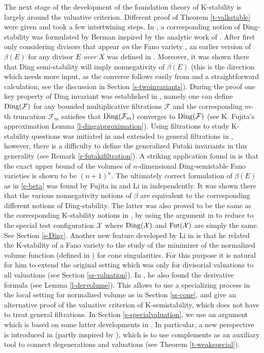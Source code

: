 \documentclass[12pt,reqno]{amsart}%
\newcommand{\cX}{{\mathcal{X}}}
\newcommand{\cF}{\mathcal{F}}
\theoremstyle{definition}
\theoremstyle{remark}
\newcommand{\Fut}{{\rm Fut}}
\newcommand{\Ding}{{\rm Ding}}
\begin{document}
The next stage of the development of the foundation theory of K-stability is largely around the valuative criterion.
Different proof of Theorem \ref{t-valkstable} were given and took a few intertwining steps.
In \cite{Ber16}, a corresponding notion of Ding-stability was formulated by Berman inspired by the analytic work of \cite{Din88}. After first only considering divisors that appear {\it on} the Fano variety \cite{Fuj16},  an earlier version of $\beta(E)$ for any divisor $E$ {\it over} $X$ was defined in \cite{Fuj18}. Moreover, it was shown there that Ding semi-stability will imply nonnegativity of $\beta(E)$ (this is the direction which needs more input, as the converse follows easily from \cite{LX14} and a straightforward calculation, see the discussion in Section \ref{s-twoinvariants}). During the proof one key property of Ding invariant was  established in \cite{Fuj18}, namely one can define $\Ding(\cF)$ for any bounded multiplicative filtrations $\cF$ and the corresponding $m$-th truncation $\cF_m$ satisfies that $\Ding(\cF_m)$ converges to $\Ding(\cF)$ (see K. Fujita's approximation Lemma \ref{l-dingapproximation}).  Using filtrations to study K-stability questions was initiated in \cite{Nys12} and extended to general filtrations in \cite{Sze15}, however, there is a difficulty to define the generalized Futaki invariants in this generality (see Remark \ref{r-futakifiltration}).
A striking application found in \cite{Fuj18} is that the exact upper bound of the volumes of $n$-dimensional Ding-semistable Fano varieties is shown to be $(n+1)^n$.  The ultimately correct formulation of $\beta(E)$ as in \eqref{e-beta} was found by Fujita in \cite{Fuj19b} and Li in  \cite{Li17}  independently. It was shown there that the various nonnegativity notions of $\beta$ are equivalent to the corresponding different notions of Ding-stability. The latter was also proved to be the same as the corresponding K-stability notions  in \cite{BBJ15, Fuj19b}, by using the argument in \cite{LX14} to reduce to the special test configuration $\cX$ where $\Ding(\cX)$ and $\Fut(\cX)$ are simply the same. See Section \ref{s-Ding}. Another new feature developed by Li in \cite{Li17} is that he related the K-stability of a Fano variety to the study of the minimizer of the normalized volume function (defined in \cite{Li18}) for cone singularities. For this purpose it is natural for him to extend the original setting which was only for divisorial valuations to all valuations (see Section \ref{ss-valuation}). 
In \cite{Li17}, he also found the derivative formula (see Lemma \ref{l-dervolume}). This allows \cite{LX20} to use a specializing process in the local setting for normalized volume as in Section \ref{ss-cone}, and give an alternative proof of the valuative criterion of K-semistability, which does not have to treat general filtrations. In Section \ref{s-specialvaluation}, we use an argument which is based on some latter developments in \cite{BJ20, BLX19}. In particular, a new perspective is introduced in \cite{BLX19} (partly inspired by \cite{LWX18}), which is to use complements as an auxiliary tool to connect degenerations and valuations (see Theorem \ref{t-weakspecial}). 
\end{document}
